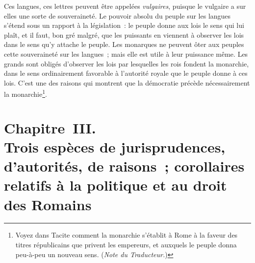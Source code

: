 \documentclass[french,twoside]{book} %
\newcommand\chapteropen{} %
\newcommand\chaptercont{} %
\newcommand\chapterclose{} %
\begin{document}
Ces langues, ces lettres peuvent être appelées {\itshape vulgaires}, puisque le vulgaire a sur elles une sorte de souveraineté. Le pouvoir absolu du peuple sur les langues s’étend sous un rapport à la législation : le peuple donne aux lois le sens qui lui plaît, et il faut, bon gré malgré, que les puissants en viennent à observer les lois dans le sens qu’y attache le peuple. Les monarques ne peuvent ôter aux peuples cette souveraineté sur les langues ; mais elle est utile à leur puissance même. Les grands sont obligés d’observer les lois par lesquelles les rois fondent la monarchie, dans le sens ordinairement favorable à l’autorité royale que le peuple donne à ces lois. C’est une des raisons qui montrent que la démocratie précède nécessairement la monarchie\footnote{Voyez dans Tacite comment la monarchie s’établit à Rome à la faveur des titres républicains que privent les empereurs, et auxquels le peuple donna peu-à-peu un nouveau sens. ({\itshape Note du Traducteur.})}.
\chapterclose


\chapteropen
\chapter[{Chapitre III. Trois espèces de jurisprudences, d’autorités, de raisons ; corollaires relatifs à la politique et au droit des Romains}]{Chapitre III. \\
Trois espèces de jurisprudences, d’autorités, de raisons ; corollaires relatifs à la politique et au droit des Romains}

\chaptercont
\end{document}
